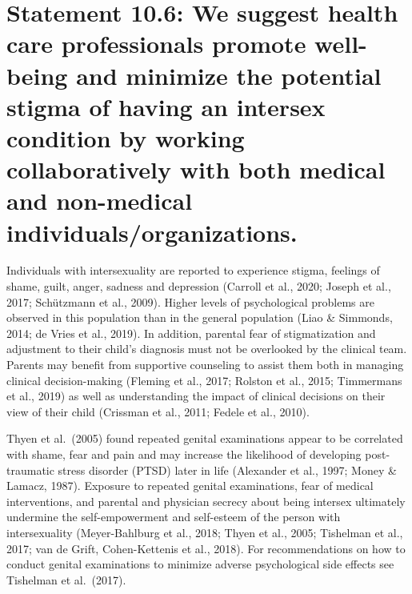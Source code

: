 \documentclass[
]{book}
\begin{document}
\hypertarget{statement-10.6-we-suggest-health-care-professionals-promote-well-being-and-minimize-the-potential-stigma-of-having-an-intersex-condition-by-working-collaboratively-with-both-medical-and-non-medical-individualsorganizations.}{%
\section*{Statement 10.6: We suggest health care professionals promote well-being and minimize the potential stigma of having an intersex condition by working collaboratively with both medical and non-medical individuals/organizations.}\label{statement-10.6-we-suggest-health-care-professionals-promote-well-being-and-minimize-the-potential-stigma-of-having-an-intersex-condition-by-working-collaboratively-with-both-medical-and-non-medical-individualsorganizations.}}

Individuals with intersexuality are reported to
experience stigma, feelings of shame, guilt, anger,
sadness and depression (Carroll et al., 2020;
Joseph et al., 2017; Schützmann et al., 2009).
Higher levels of psychological problems are
observed in this population than in the general
population (Liao \& Simmonds, 2014; de Vries
et al., 2019). In addition, parental fear of stigmatization and adjustment to their child's diagnosis must not be overlooked by the clinical
team. Parents may benefit from supportive counseling to assist them both in managing clinical
decision-making (Fleming et al., 2017; Rolston
et al., 2015; Timmermans et al., 2019) as well as
understanding the impact of clinical decisions on
their view of their child (Crissman et al., 2011;
Fedele et al., 2010).

Thyen et al.~(2005) found repeated genital
examinations appear to be correlated with shame,
fear and pain and may increase the likelihood of
developing post-traumatic stress disorder (PTSD)
later in life (Alexander et al., 1997; Money \&
Lamacz, 1987). Exposure to repeated genital
examinations, fear of medical interventions, and
parental and physician secrecy about being intersex ultimately undermine the self-empowerment
and self-esteem of the person with intersexuality
(Meyer-Bahlburg et al., 2018; Thyen et al., 2005;
Tishelman et al., 2017; van de Grift, Cohen-Kettenis
et al., 2018). For recommendations on how to
conduct genital examinations to minimize adverse
psychological side effects see Tishelman
et al.~(2017).
\end{document}
